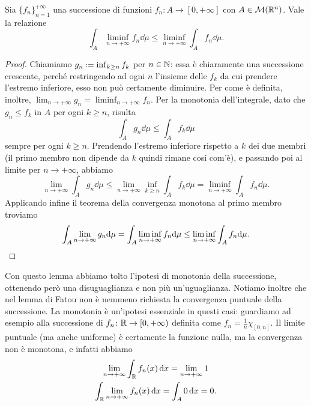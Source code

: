 \begin{lemma}[Fatou] \label{l:fatou}
	Sia $\{f_n\}_{n=1}^{+\infty}$ una successione di funzioni $f_n\colon A\to[0,+\infty]$ con $A\in\mathcal M(\mathbb{R}^n)$.
	Vale la relazione
	\begin{equation}
		\int_A\liminf_{n\to+\infty}f_n\dd\mu\leq\liminf_{n\to+\infty}\int_Af_n\dd\mu.
		\label{eq:fatou}
	\end{equation}
\end{lemma}
\begin{proof}
	Chiamiamo $g_n\defeq\inf_{k\geq n}f_k$ per $n\in\mathbb{N}$: essa è chiaramente una successione crescente, perch\'e restringendo ad ogni $n$ l'insieme delle $f_k$ da cui prendere l'estremo inferiore, esso non può certamente diminuire.
	Per come è definita, inoltre, $\lim_{n\to+\infty}g_n=\liminf_{n\to+\infty}f_n$.
	Per la monotonia dell'integrale, dato che $g_n\leq f_k$ in $A$ per ogni $k\geq n$, risulta
	\begin{equation}
		\int_Ag_n\dd\mu\leq\int_Af_k\dd\mu
	\end{equation}
	sempre per ogni $k\geq n$.
	Prendendo l'estremo inferiore rispetto a $k$ dei due membri (il primo membro non dipende da $k$ quindi rimane cos\'i com'è), e passando poi al limite per $n\to+\infty$, abbiamo
	\begin{equation}
		\lim_{n\to+\infty}\int_Ag_n\dd\mu\leq\lim_{n\to+\infty}\inf_{k\geq n}\int_Af_k\dd\mu=\liminf_{n\to+\infty}\int_Af_n\dd\mu.
	\end{equation}
	Applicando infine il teorema della convergenza monotona al primo membro troviamo
	\begin{equation}
		\int_A\lim_{n\to+\infty}g_n\textup{d}\mu=\int_A\liminf_{n\to+\infty}f_n\textup{d}\mu\leq\liminf_{n\to+\infty}\int_Af_n\textup{d}\mu.\qedhere
	\end{equation}
\end{proof}
Con questo lemma abbiamo tolto l'ipotesi di monotonia della successione, ottenendo però una disuguaglianza e non più un'uguaglianza.
Notiamo inoltre che nel lemma di Fatou non è nemmeno richiesta la convergenza puntuale della successione.
La monotonia è un'ipotesi essenziale in questi casi: guardiamo ad esempio alla successione di $f_n\colon\mathbb{R}\to[0,+\infty)$ definita come $f_n=\frac1{n}\chi_{[0,n]}$.
Il limite puntuale (ma anche uniforme) è certamente la funzione nulla, ma la convergenza non è monotona, e infatti abbiamo
\begin{gather*}
	\lim_{n\to+\infty}\int_{\mathbb{R}}f_n(x)\,\textup{d} x=\lim_{n\to+\infty}1\\
	\int_{\mathbb{R}}\lim_{n\to+\infty}f_n(x)\,\textup{d} x=\int_A0\,\textup{d} x=0.
\end{gather*}

